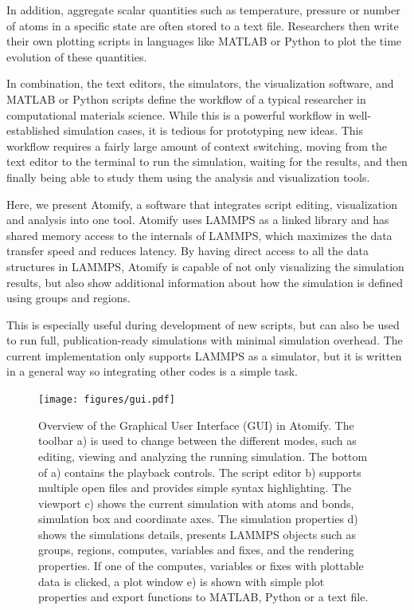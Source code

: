 \documentclass[12pt,a4paper,final]{iopart}
\begin{document}
In addition, aggregate scalar quantities such as temperature, pressure or number of atoms in a specific state are often stored to a
text file. Researchers then write their own plotting scripts in languages like MATLAB or Python
to plot the time evolution of these quantities. 

In combination, the text editors, the simulators, the visualization software, and MATLAB or Python scripts define the workflow of a typical researcher in computational
materials science.
While this is a powerful workflow in well-established simulation cases,
it is tedious for prototyping new ideas.
This workflow requires a fairly large amount of context switching,
moving from the text editor to the terminal to run the simulation,
waiting for the results, and then finally being able to study them using the analysis
and visualization tools.

Here, we present Atomify, a software that integrates script editing,
visualization and analysis into one tool.
Atomify uses LAMMPS as a linked library and has shared memory access to the internals of LAMMPS,
which maximizes the data transfer speed and reduces latency.
By having direct access to all the data structures in LAMMPS, Atomify is capable of not only visualizing the simulation results,
but also show additional information about how the simulation is defined using groups and regions.

This is especially useful during development of new scripts, but can also be used
to run full, publication-ready simulations with minimal simulation overhead.
The current implementation only supports LAMMPS as a simulator, but it is written in a general
way so integrating other codes is a simple task.

\begin{figure}
	\centering
	\texttt{[image: figures/gui.pdf]}
	\caption{%
	Overview of the Graphical User Interface (GUI) in Atomify.
	The toolbar a) is used to change between the different modes, such as
	editing, viewing and analyzing the running simulation.
	The bottom of a) contains the playback controls.
	The script editor b) supports multiple open files and provides simple syntax highlighting.
	The viewport c) shows the current simulation with atoms and bonds, simulation box and coordinate axes.
	The simulation properties d) shows the simulations details, presents
	LAMMPS objects such as groups, regions, computes, variables and fixes, and the rendering
	properties. If one of the computes, variables or fixes with plottable data is clicked, a plot window
	e) is shown with simple plot properties and export functions to MATLAB, Python or a text file.
	}
	\label{fig:gui}
\end{figure}
\end{document}
